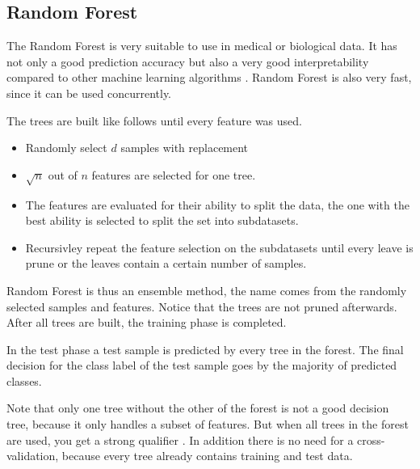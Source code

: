 \documentclass{sig-alternate-05-2015}
\begin{document}
\subsection{Random Forest}
The Random Forest is very suitable to use in medical or biological data. It has not only a good prediction accuracy but also a very good interpretability compared to other machine learning algorithms \cite{qi2012random}. Random Forest is also very fast, since it can be used concurrently.

The trees are built like follows until every feature was used.
\begin{itemize}
\item Randomly select $d$ samples with replacement
\item $ \sqrt{n}$ out of $n$ features are selected for one tree.
\item The features are evaluated for their ability to split the data, the one with the best ability is selected to split the set into subdatasets.
\item Recursivley repeat the feature selection on the subdatasets until every leave is prune or the leaves contain a certain number of samples.
\end{itemize}
Random Forest is thus an ensemble method, the name comes from the randomly selected samples and features. Notice that the trees are not pruned afterwards.  After all trees are built, the training phase is completed.

In the test phase a test sample is predicted by every tree in the forest. The final decision for the class label of the test sample goes by the majority of predicted classes.

Note that only one tree without the other of the forest is not a good decision tree, because it only handles a subset of features. But when all trees in the forest are used, you get a strong qualifier \cite{touw2012data}. In addition there is no need for a cross-validation, because every tree already contains training and test data.
\end{document}
